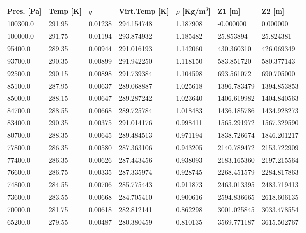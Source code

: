 \begin{tabular}{lllllll}
\toprule
Pres. [Pa] & Temp [K] &     $q$ & Virt.Temp [K] & $\rho$ [Kg/m$^3$] &       Z1 [m] &       Z2 [m] \\
\midrule
  100300.0 &   291.95 & 0.01238 &    294.154748 &          1.187908 &    -0.000000 &     0.000000 \\
  100000.0 &   291.75 & 0.01194 &    293.874932 &          1.185482 &    25.853894 &    25.824381 \\
   95400.0 &   289.35 & 0.00944 &    291.016193 &          1.142060 &   430.360310 &   426.069349 \\
   93700.0 &   290.35 & 0.00899 &    291.942250 &          1.118150 &   583.851720 &   580.377143 \\
   92500.0 &   290.15 & 0.00898 &    291.739384 &          1.104598 &   693.561072 &   690.705000 \\
   85100.0 &   287.95 & 0.00637 &    289.068887 &          1.025618 &  1396.783479 &  1394.853853 \\
   85000.0 &   288.15 & 0.00647 &    289.287242 &          1.023640 &  1406.619982 &  1404.840563 \\
   84700.0 &   288.55 & 0.00668 &    289.725784 &          1.018483 &  1436.185786 &  1434.928273 \\
   83400.0 &   290.35 & 0.00375 &    291.014176 &          0.998411 &  1565.291972 &  1567.329590 \\
   80700.0 &   288.35 & 0.00645 &    289.484513 &          0.971194 &  1838.726674 &  1846.201217 \\
   77800.0 &   286.35 & 0.00580 &    287.363106 &          0.943205 &  2140.789472 &  2153.722909 \\
   77400.0 &   286.35 & 0.00626 &    287.443456 &          0.938093 &  2183.165360 &  2197.215564 \\
   76600.0 &   286.75 & 0.00335 &    287.335974 &          0.928745 &  2268.451579 &  2284.817863 \\
   74800.0 &   284.55 & 0.00706 &    285.775443 &          0.911873 &  2463.013395 &  2483.719413 \\
   73600.0 &   283.55 & 0.00668 &    284.705410 &          0.900616 &  2594.836665 &  2618.606135 \\
   70000.0 &   281.75 & 0.00618 &    282.812141 &          0.862298 &  3001.025845 &  3033.478554 \\
   65200.0 &   279.55 & 0.00487 &    280.380459 &          0.810135 &  3569.771187 &  3615.502767 \\

\end{tabular}
